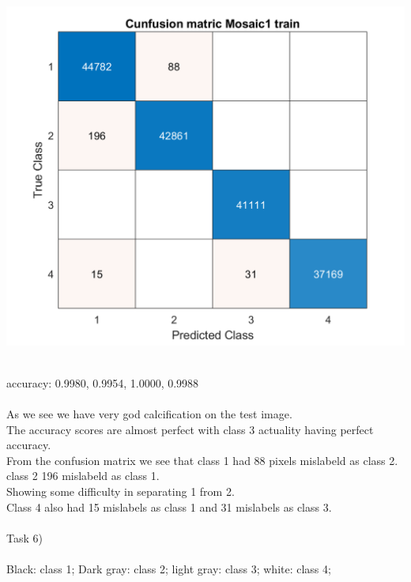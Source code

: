 \documentclass[12pt, letterpaper, twoside]{article}
\begin{document}
\hfill
\begin{minipage}{0.45\textwidth}
\includegraphics[scale=0.25]{"conf1"}\\
\end{minipage}%
\ \\
accuracy: 0.9980, 0.9954, 1.0000, 0.9988\\
\ \\
As we see we have very god calcification on the test image.\\
The accuracy scores are almost perfect with class 3 actuality having perfect accuracy.\\
From the confusion matrix we see that class 1 had 88 pixels mislabeld as class 2.\\
class 2 196 mislabeld as class 1.\\
Showing some difficulty in separating 1 from 2.\\
Class 4 also had 15 mislabels as class 1 and 31 mislabels as class 3.\\
\newpage
\ \\
Task 6)\\
\ \\
Black: class 1; Dark gray: class 2; light gray: class 3; white: class 4;\\
\ \\
\end{document}

